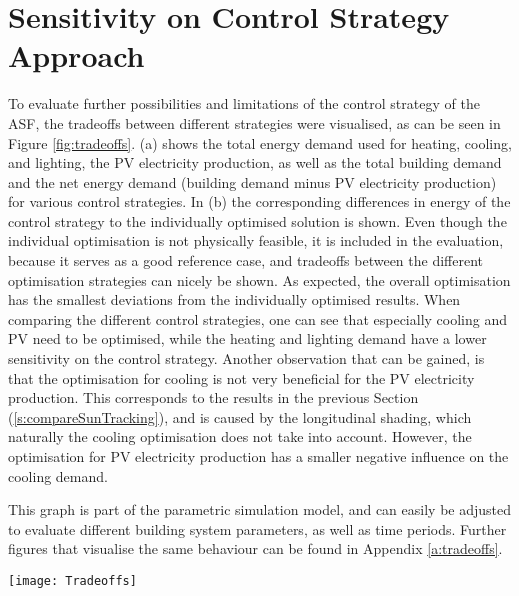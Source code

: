 \section{Sensitivity on Control Strategy Approach}
\label{s:tradeoffs}

	To evaluate further possibilities and limitations of the control strategy of the ASF, the tradeoffs between different strategies were visualised, as can be seen in Figure \ref{fig:tradeoffs}. (a) shows the total energy demand used for heating, cooling, and lighting, the PV electricity production, as well as the total building demand and the net energy demand (building demand minus PV electricity production) for various control strategies. In (b) the corresponding differences in energy of the control strategy to the individually optimised solution is shown. Even though the individual optimisation is not physically feasible, it is included in the evaluation, because it serves as a good reference case, and tradeoffs between the different optimisation strategies can nicely be shown. As expected, the overall optimisation has the smallest deviations from the individually optimised results. When comparing the different control strategies, one can see that especially cooling and PV need to be optimised, while the heating and lighting demand have a lower sensitivity on the control strategy. Another observation that can be gained, is that the optimisation for cooling is not very beneficial for the PV electricity production. This corresponds to the results in the previous Section (\ref{s:compareSunTracking}), and is caused by the longitudinal shading, which naturally the cooling optimisation does not take into account. However, the optimisation for PV electricity production has a smaller negative influence on the cooling demand. 

	This graph is part of the parametric simulation model, and can easily be adjusted to evaluate different building system parameters, as well as time periods. Further figures that visualise the same behaviour can be found in Appendix \ref{a:tradeoffs}.

	\begin{figure*}
		\begin{center}
		\texttt{[image: Tradeoffs]}
		\caption{Comparison of different control strategies. (a) Total energy demand per room area. (b) Energy difference to individually optimised solution. While the individually optimised solution is not physically feasible, it is well suited for comparison and to emphasize the tradeoffs between the different optimisations.}
		\label{fig:tradeoffs}
		\end{center}
	\end{figure*}


